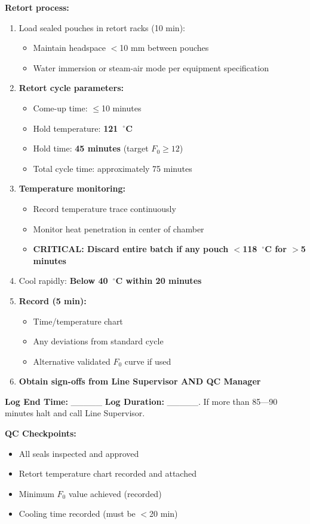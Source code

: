 {\textbf{Retort process:}
\begin{enumerate}[resume,leftmargin=1.5em]
\item Load sealed pouches in retort racks (10 min):
  \begin{itemize}
  \item Maintain headspace $<$10 mm between pouches
  \item Water immersion or steam-air mode per equipment specification
  \end{itemize}
\item \textbf{Retort cycle 
parameters:}
  \begin{itemize}
  \item Come-up time: $\le$10 minutes
  \item Hold temperature: \textbf{121~$^\circ$C}
  \item Hold time: \textbf{45 minutes} (target $F_0 \ge 12$)
  \item Total cycle time: approximately 75 minutes
  \end{itemize}
\item \textbf{Temperature monitoring:}
  \begin{itemize}
  \item Record temperature trace continuously
  \item Monitor heat penetration in center of chamber
  \item \textbf{CRITICAL: Discard entire batch if any pouch $<$118~$^\circ$C for $>$5 minutes}
  \end{itemize}
\item Cool rapidly: \textbf{Below 40~$^\circ$C within 20 minutes}
\item \textbf{Record (5 min):}
  \begin{itemize}
  \item Time/temperature chart
  \item Any deviations from standard cycle
  \item Alternative validated $F_0$ curve if used
  
\end{itemize}
\item \textbf{Obtain sign-offs from Line Supervisor AND QC Manager}
\end{enumerate}
\textbf{Log End Time:} \_\_\_\_\_
\textbf{Log Duration:} \_\_\_\_\_.
If more than 85---90 minutes halt and call Line Supervisor.

\textbf{QC Checkpoints:}
\begin{itemize}
\item All seals inspected and approved
\item Retort temperature chart recorded and attached
\item Minimum $F_0$ value achieved (recorded)
\item Cooling time recorded (must be $<$20 min)
\end{itemize}

}
